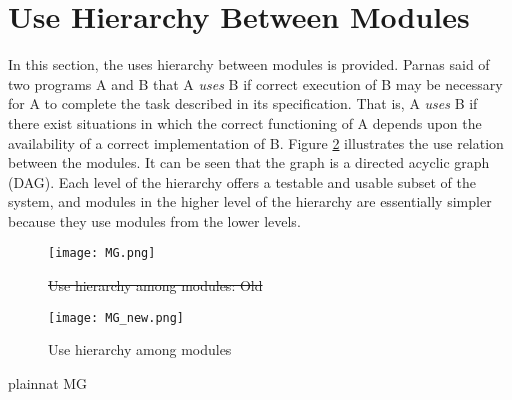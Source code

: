 \documentclass[12pt, titlepage]{article}
\begin{document}
\section{Use Hierarchy Between Modules} \label{SecUse}

In this section, the uses hierarchy between modules is
provided. Parnas said of two programs A and B that A {\em uses} B if
correct execution of B may be necessary for A to complete the task described in
its specification. That is, A {\em uses} B if there exist situations in which
the correct functioning of A depends upon the availability of a correct
implementation of B.  Figure \ref{FigUH} illustrates the use relation between
the modules. It can be seen that the graph is a directed acyclic graph
(DAG). Each level of the hierarchy offers a testable and usable subset of the
system, and modules in the higher level of the hierarchy are essentially simpler
because they use modules from the lower levels.

\begin{figure}[H]
\centering
\texttt{[image: MG.png]}
\caption{\sout{Use hierarchy among modules: Old}}
\label{FigUH}
\end{figure}

\begin{figure}[H]
\centering
\texttt{[image: MG\_new.png]}
\caption{{\color{red} Use hierarchy among modules}}
\label{FigUH}
\end{figure}


 {plainnat}
 {MG}
\end{document}
